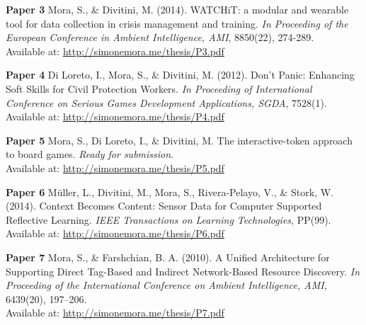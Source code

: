 \documentclass[a4paper,11pt]{article}
\begin{document}
\textbf{Paper 3} Mora, S., \& Divitini, M. (2014). WATCHiT: a modular and wearable tool for data collection in crisis management and training. \emph{In Proceeding of the European Conference in Ambient Intelligence, AMI}, 8850(22), 274-289. \\ Available at: \href{http://simonemora.me/thesis/P3.pdf}{http://simonemora.me/thesis/P3.pdf}
\vspace{0.3cm}

\textbf{Paper 4} Di Loreto, I., Mora, S., \& Divitini, M. (2012). Don't Panic: Enhancing Soft Skills for Civil Protection Workers. \emph{In Proceeding of International Conference on Serious Games Development Applications, SGDA}, 7528(1). \\ Available at: \href{http://simonemora.me/thesis/P4.pdf}{http://simonemora.me/thesis/P4.pdf}
\vspace{0.3cm}

\textbf{Paper 5} Mora, S., Di Loreto, I., \& Divitini, M. The interactive-token approach to board games. \emph{Ready for submission}. \\ Available at: \href{http://simonemora.me/thesis/P5.pdf}{http://simonemora.me/thesis/P5.pdf}
\vspace{0.3cm}

\textbf{Paper 6} Müller, L., Divitini, M., Mora, S., Rivera-Pelayo, V., \& Stork, W. (2014). Context Becomes Content: Sensor Data for Computer Supported Reflective Learning. \emph{IEEE Transactions on Learning Technologies}, PP(99). \\ Available at: \href{http://simonemora.me/thesis/P6.pdf}{http://simonemora.me/thesis/P6.pdf}
\vspace{0.3cm}

\textbf{Paper 7} Mora, S., \& Farshchian, B. A. (2010). A Unified Architecture for Supporting Direct Tag-Based and Indirect Network-Based Resource Discovery. \emph{In Proceeding of the International Conference on Ambient Intelligence, AMI}, 6439(20), 197--206. \\ Available at: \href{http://simonemora.me/thesis/P7.pdf}{http://simonemora.me/thesis/P7.pdf}
\end{document}

